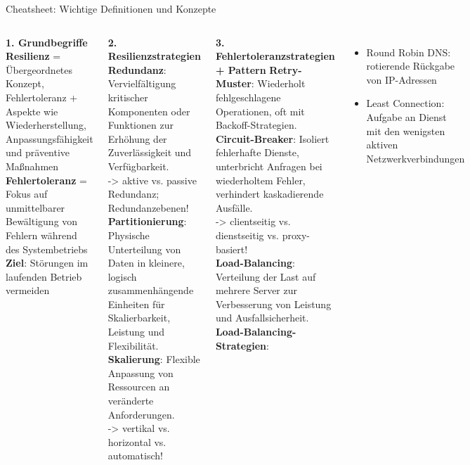 \begin{frame}[shrink=10]{Cheatsheet: Wichtige Definitionen und Konzepte}
    \scriptsize
    \justifying

    \begin{columns}[t]
        \textbf{1. Grundbegriffe}\\
        \textbf{Resilienz} = Übergeordnetes Konzept, Fehlertoleranz + Aspekte wie
        Wiederherstellung, Anpassungsfähigkeit und präventive Maßnahmen\\
        \textbf{Fehlertoleranz} = Fokus auf unmittelbarer Bewältigung von Fehlern während des
        Systembetriebs\\
        \textbf{Ziel}: Störungen im laufenden Betrieb vermeiden

        \textbf{2. Resilienzstrategien}\\
            \textbf{Redundanz}: Vervielfältigung kritischer Komponenten oder Funktionen zur Erhöhung der
            Zuverlässigkeit und Verfügbarkeit.\\
        -> aktive vs. passive Redundanz; Redundanzebenen!\\
            \textbf{Partitionierung}: Physische Unterteilung von Daten in kleinere, logisch zusammenhängende Einheiten
            für Skalierbarkeit, Leistung und Flexibilität.\\
            \textbf{Skalierung}: Flexible Anpassung von Ressourcen an veränderte Anforderungen.\\
        -> vertikal vs. horizontal vs. automatisch!


        \textbf{3. Fehlertoleranzstrategien + Pattern}
            \textbf{Retry-Muster}: Wiederholt fehlgeschlagene Operationen, oft mit Backoff-Strategien.\\
            \textbf{Circuit-Breaker}: Isoliert fehlerhafte Dienste, unterbricht Anfragen bei wiederholtem Fehler,
            verhindert kaskadierende Ausfälle.\\
        -> clientseitig vs. dienstseitig vs. proxy-basiert!\\
            \textbf{Load-Balancing}: Verteilung der Last auf mehrere Server zur Verbesserung von Leistung und
            Ausfallsicherheit.\\
            \textbf{Load-Balancing-Strategien}:
            \begin{itemize}
                \item Round Robin DNS: rotierende Rückgabe von IP-Adressen
                \item Least Connection: Aufgabe an Dienst mit den wenigsten aktiven Netzwerkverbindungen
            \end{itemize}
    \end{columns}
\end{frame}
